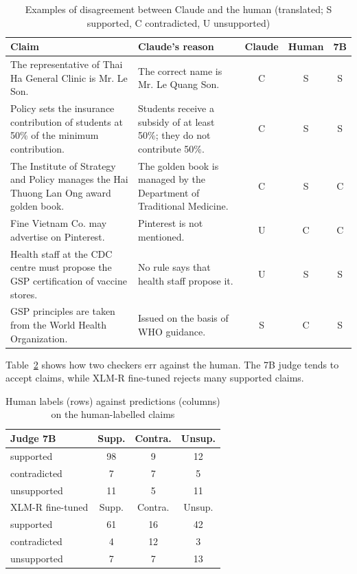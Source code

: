 \documentclass[conference]{IEEEtran}
\begin{document}
\begin{table}[t]
\caption{Examples of disagreement between Claude and the human (translated; S supported, C contradicted, U unsupported)}
\label{tab:dis}
\centering
\footnotesize
\begin{tabular}{p{}p{}ccc}
\toprule
Claim & Claude's reason & Claude & Human & 7B \\
\midrule
The representative of Thai Ha General Clinic is Mr. Le Son. & The correct name is Mr. Le Quang Son. & C & S & S \\
Policy sets the insurance contribution of students at 50\% of the minimum contribution. & Students receive a subsidy of at least 50\%; they do not contribute 50\%. & C & S & S \\
The Institute of Strategy and Policy manages the Hai Thuong Lan Ong award golden book. & The golden book is managed by the Department of Traditional Medicine. & C & S & C \\
Fine Vietnam Co. may advertise on Pinterest. & Pinterest is not mentioned. & U & C & C \\
Health staff at the CDC centre must propose the GSP certification of vaccine stores. & No rule says that health staff propose it. & U & S & S \\
GSP principles are taken from the World Health Organization. & Issued on the basis of WHO guidance. & S & C & S \\
\bottomrule
\end{tabular}
\end{table}

Table~\ref{tab:cfh} shows how two checkers err against the human. The 7B judge tends to accept claims, while XLM-R fine-tuned rejects many supported claims.

\begin{table}[t]
\caption{Human labels (rows) against predictions (columns) on the human-labelled claims}
\label{tab:cfh}
\centering
\footnotesize
\begin{tabular}{lccc}
\toprule
Judge 7B & Supp. & Contra. & Unsup. \\
\midrule
supported & 98 & 9 & 12 \\
contradicted & 7 & 7 & 5 \\
unsupported & 11 & 5 & 11 \\
\midrule
XLM-R fine-tuned & Supp. & Contra. & Unsup. \\
\midrule
supported & 61 & 16 & 42 \\
contradicted & 4 & 12 & 3 \\
unsupported & 7 & 7 & 13 \\
\bottomrule
\end{tabular}
\end{table}
\end{document}
